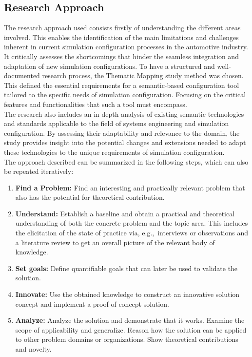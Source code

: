 \clearpage
\subsection{Research Approach}
The research approach used consists firstly of understanding the different areas involved. This enables the identification of the main limitations and challenges inherent in current simulation configuration processes in the automotive industry. It critically assesses the shortcomings that hinder the seamless integration and adaptation of new simulation configurations.
To have a structured and well-documented research process, the Thematic Mapping study method was chosen.\\

This defined the essential requirements for a semantic-based configuration tool tailored to the specific needs of simulation configuration. Focusing on the critical features and functionalities that such a tool must encompass.\\

The research also includes an in-depth analysis of existing semantic technologies and standards applicable to the field of systems engineering and simulation configuration. By assessing their adaptability and relevance to the domain, the study provides insight into the potential changes and extensions needed to adapt these technologies to the unique requirements of simulation configuration.\\

The approach described can be summarized in the following steps, which can also be repeated iteratively:

\begin{enumerate}
    \item \textbf{Find a Problem:} Find an interesting and practically relevant problem that also
        has the potential for theoretical contribution.
    \item \textbf{Understand:} Establish a baseline and obtain a practical and theoretical
        understanding of both the concrete problem and the topic area. This includes the
        elicitation of the state of practice via, e.g.,~interviews or observations and a
        literature review to get an overall picture of the relevant body of knowledge.
    \item \textbf{Set goals:} Define quantifiable goals that can later be used to validate the
        solution.
    \item \textbf{Innovate:} Use the obtained knowledge to construct an innovative solution
        concept and implement a proof of concept solution.
    \item \textbf{Analyze:} Analyze the solution and demonstrate that it works. Examine the scope
        of applicability and generalize. Reason how the solution can be applied to other problem
        domains or organizations. Show theoretical contributions and novelty.
\end{enumerate}


